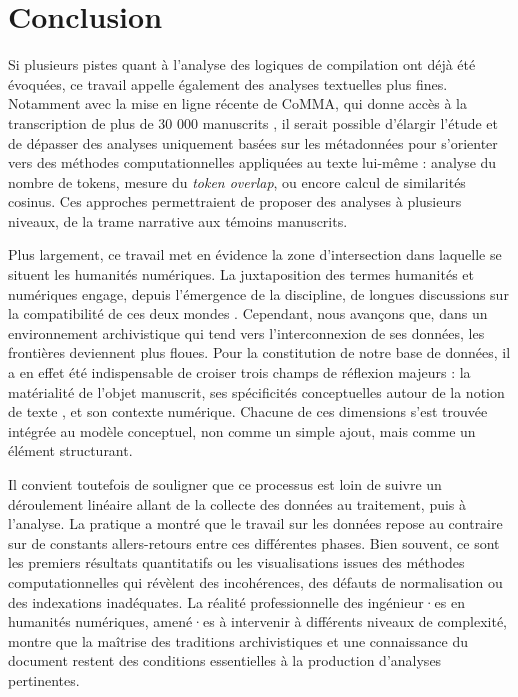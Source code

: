 \documentclass[final, fra]{anthology-ch}     %
\begin{document}
\section*{Conclusion}

Si plusieurs pistes quant à l'analyse des logiques de compilation ont déjà été évoquées, ce travail appelle également des analyses textuelles plus fines. Notamment avec la mise en ligne récente de CoMMA, qui donne accès à la transcription de plus de 30 000 manuscrits \cite{clerice_comma_2025}, il serait possible d'élargir l'étude et de dépasser des analyses uniquement basées sur les métadonnées pour s'orienter vers des méthodes computationnelles appliquées au texte lui-même : analyse du nombre de tokens, mesure du \textit{token overlap}, ou encore calcul de similarités cosinus. Ces approches permettraient de proposer des analyses à plusieurs niveaux, de la trame narrative aux témoins manuscrits.

Plus largement, ce travail met en évidence la zone d'intersection dans laquelle se situent les humanités numériques. La juxtaposition des termes \og humanités \fg{} et \og numériques \fg{} engage, depuis l'émergence de la discipline, de longues discussions sur la compatibilité de ces deux \og mondes \fg{}. Cependant, nous avançons que, dans un environnement archivistique qui tend vers l'interconnexion de ses données, les frontières deviennent plus floues. Pour la constitution de notre base de données, il a en effet été indispensable de croiser trois champs de réflexion majeurs : la matérialité de l'objet manuscrit, ses spécificités conceptuelles autour de la notion de \og texte \fg{}, et son contexte numérique. Chacune de ces dimensions s'est trouvée intégrée au modèle conceptuel, non comme un simple ajout, mais comme un élément structurant.

Il convient toutefois de souligner que ce processus est loin de suivre un déroulement linéaire allant de la collecte des données au traitement, puis à l'analyse. La pratique a montré que le travail sur les données repose au contraire sur de constants allers-retours entre ces différentes phases. Bien souvent, ce sont les premiers résultats quantitatifs ou les visualisations issues des méthodes computationnelles qui révèlent des incohérences, des défauts de normalisation ou des indexations inadéquates. La réalité professionnelle des ingénieur·es en humanités numériques, amené·es à intervenir à différents niveaux de complexité, montre que la maîtrise des traditions archivistiques et une connaissance du document restent des conditions essentielles à la production d’analyses pertinentes.
\end{document}
